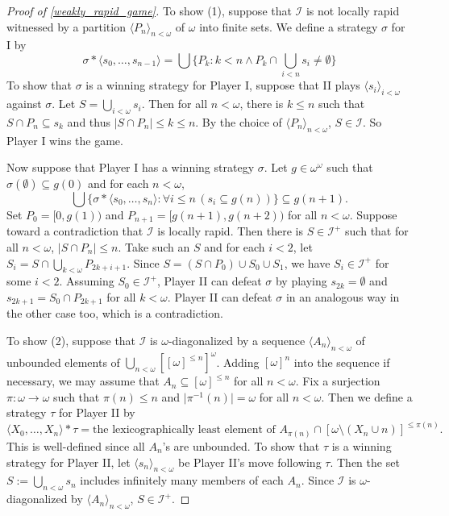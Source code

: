 \documentclass[a4paper,12pt]{amsart}
\theoremstyle{definition}
\numberwithin{thm}{section}
\numberwithin{equation}{section}
\newcommand{\I}{\mathscr{I}}
\renewcommand{\subset}{\subseteq}
\begin{document}
    \begin{proof}[Proof of \cref{weakly_rapid_game}]
        To show (1), suppose that $\I$ is not locally rapid witnessed by a partition $\langle P_n\rangle_{n<\omega}$ of $\omega$ into finite sets. We define a strategy $\sigma$ for I by
        \[
        \sigma*\langle s_0, \ldots, s_{n-1}\rangle = \bigcup\{P_k: k < n \land  P_k\cap\bigcup_{i<n}s_i \neq \emptyset\}
        \]
        To show that $\sigma$ is a winning strategy for Player I, suppose that II plays $\langle s_i\rangle_{i<\omega}$ against $\sigma$. Let $S = \bigcup_{i<\omega} s_i$. Then for all $n < \omega$, there is $k\leq n$ such that $S\cap P_n \subset s_k$ and thus $\lvert S \cap P_n\rvert \leq k \leq n$. By the choice of $\langle P_n\rangle_{n<\omega}$, $S\in\I$. So Player I wins the game.

        Now suppose that Player I has a winning strategy $\sigma$. Let $g\in\omega^\omega$ such that $\sigma(\emptyset)\subset g(0)$ and for each $n<\omega$,
        \[
        \bigcup\{\sigma*\langle s_0, \ldots, s_n\rangle:\forall i \leq n\,(s_i\subset g(n))\}\subset g(n+1).
        \]
        Set $P_0 = [0, g(1))$ and $P_{n+1} = [g(n+1), g(n+2))$ for all $n<\omega$. Suppose toward a contradiction that $\I$ is locally rapid. Then there is $S\in\I^+$ such that for all $n<\omega$, $\lvert S \cap P_n \rvert \leq n$. Take such an $S$ and for each $i<2$, let $S_i = S \cap \bigcup_{k < \omega} P_{2k+i+1}$. Since $S = (S\cap P_0) \cup S_0 \cup S_1$, we have $S_i\in\I^+$ for some $i < 2$. Assuming $S_0\in\I^+$, Player II can defeat $\sigma$ by playing $s_{2k} = \emptyset$ and $s_{2k+1} = S_0\cap P_{2k+1}$ for all $k<\omega$. Player II can defeat $\sigma$ in an analogous way in the other case too, which is a contradiction.

        To show (2), suppose that $\I$ is $\omega$-diagonalized by a sequence $\langle A_n\rangle_{n<\omega}$ of unbounded elements of $\bigcup_{n<\omega}[[\omega]^{\leq n}]^{\omega}$. Adding $[\omega]^n$ into the sequence if necessary, we may assume that $A_n \subset [\omega]^{\leq n}$ for all $n<\omega$. Fix a surjection $\pi\colon\omega\to\omega$ such that $\pi(n) \leq n$ and $\lvert\pi^{-1}(n)\rvert=\omega$ for all $n<\omega$. Then we define a strategy $\tau$ for Player II by 
        \[
        \langle X_0, \ldots, X_n\rangle*\tau = \text{the lexicographically least element of } A_{\pi(n)} \cap [\omega\setminus (X_n\cup n)]^{\leq\pi(n)}.
        \]
        This is well-defined since all $A_n$'s are unbounded. To show that $\tau$ is a winning strategy for Player II, let $\langle s_n\rangle_{n<\omega}$ be Player II's move following $\tau$. Then the set $S:=\bigcup_{n<\omega}s_n$ includes infinitely many members of each $A_n$. Since $\I$ is $\omega$-diagonalized by $\langle A_n\rangle_{n<\omega}$, $S\in\I^+$.


\end{proof}
\end{document}
